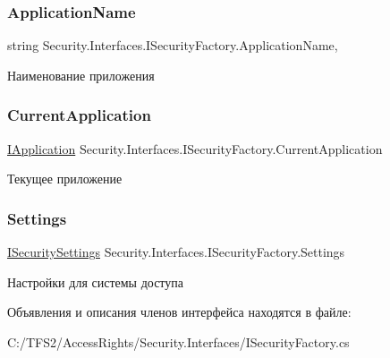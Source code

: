 \subsubsection{\texorpdfstring{Application\+Name}{ApplicationName}}
{\footnotesize\ttfamily string Security.\+Interfaces.\+I\+Security\+Factory.\+Application\+Name\hspace{0.3cm}{\ttfamily [get]}, {\ttfamily [set]}}



Наименование приложения 

\mbox{\label{interface_security_1_1_interfaces_1_1_i_security_factory_a83db1d288369e763449e69b6c1bc992f}} 
\subsubsection{\texorpdfstring{Current\+Application}{CurrentApplication}}
{\footnotesize\ttfamily \hyperlink{interface_security_1_1_interfaces_1_1_model_1_1_i_application}{I\+Application} Security.\+Interfaces.\+I\+Security\+Factory.\+Current\+Application\hspace{0.3cm}{\ttfamily [get]}}



Текущее приложение 

\mbox{\label{interface_security_1_1_interfaces_1_1_i_security_factory_a46941edf494ff525d842a665548b59f4}} 
\subsubsection{\texorpdfstring{Settings}{Settings}}
{\footnotesize\ttfamily \hyperlink{interface_security_1_1_interfaces_1_1_i_security_settings}{I\+Security\+Settings} Security.\+Interfaces.\+I\+Security\+Factory.\+Settings\hspace{0.3cm}{\ttfamily [get]}}



Настройки для системы доступа 



Объявления и описания членов интерфейса находятся в файле\+:\begin{DoxyCompactItemize}
\item 
C\+:/\+T\+F\+S2/\+Access\+Rights/\+Security.\+Interfaces/I\+Security\+Factory.\+cs\end{DoxyCompactItemize}
